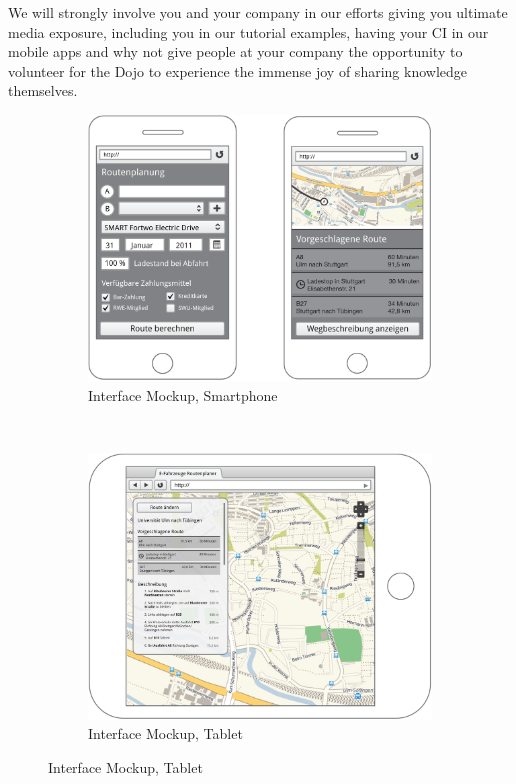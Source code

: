 \documentclass{proposal}
\begin{document}
We will strongly involve you and your company in our efforts giving you ultimate media exposure, including you in our tutorial examples, having your CI in our mobile apps and why not give people at your company the opportunity to volunteer for the Dojo to experience the immense joy of sharing knowledge themselves.

\begin{figure}[h]
        \centering
        \begin{subfigure}[b]{0.5\textwidth}
                \centering
	  \includegraphics[scale=0.14]{images/phones}
                \caption{Interface Mockup, Smartphone}
                \label{fig:gull}
        \end{subfigure}%
        ~ 
        \begin{subfigure}[b]{0.5\textwidth}
                \centering
                \includegraphics[scale=0.14]{images/tablet}
                \caption{Interface Mockup, Tablet}
                \label{fig:tiger}
        \end{subfigure}
\end{figure}
\end{document}
